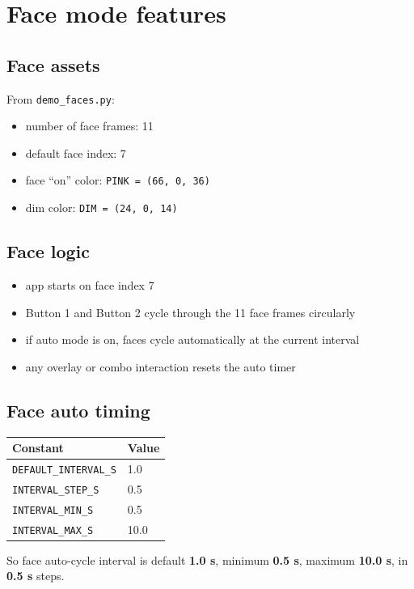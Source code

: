 \documentclass[11pt]{article}
\begin{document}
\section{Face mode features}
\subsection{Face assets}
From \texttt{demo\_faces.py}:
\begin{itemize}
  \item number of face frames: 11
  \item default face index: 7
  \item face ``on'' color: \texttt{PINK = (66, 0, 36)}
  \item dim color: \texttt{DIM = (24, 0, 14)}
\end{itemize}

\subsection{Face logic}
\begin{itemize}
  \item app starts on face index 7
  \item Button 1 and Button 2 cycle through the 11 face frames circularly
  \item if auto mode is on, faces cycle automatically at the current interval
  \item any overlay or combo interaction resets the auto timer
\end{itemize}

\subsection{Face auto timing}
\begin{center}
\begin{tabular}{ll}
\toprule
Constant & Value \\
\midrule
\texttt{DEFAULT\_INTERVAL\_S} & 1.0 \\
\texttt{INTERVAL\_STEP\_S} & 0.5 \\
\texttt{INTERVAL\_MIN\_S} & 0.5 \\
\texttt{INTERVAL\_MAX\_S} & 10.0 \\
\bottomrule
\end{tabular}
\end{center}

So face auto-cycle interval is default \textbf{1.0 s}, minimum \textbf{0.5 s}, maximum \textbf{10.0 s}, in \textbf{0.5 s} steps.
\end{document}
